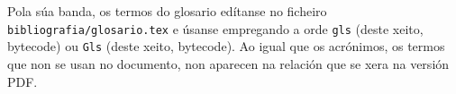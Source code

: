 Pola súa banda, os termos do glosario edítanse no ficheiro
\texttt{bibliografia/glo\-sa\-rio.tex} e úsanse empregando a orde
\texttt{gls} (deste xeito, \gls{bytecode}) ou \texttt{Gls} (deste
xeito, \Gls{bytecode}). Ao igual que os acrónimos, os termos que non
se usan no documento, non aparecen na relación que se xera na versión
PDF.
